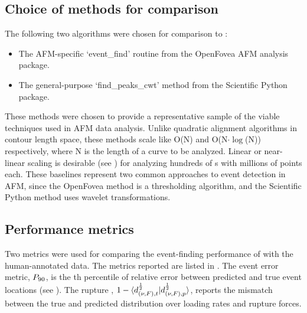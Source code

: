 \subsection{Choice of methods for comparison}

The following two algorithms were chosen for comparison to \name{}: 

\begin{itemize}
\item The AFM-specific `event\_find' routine from the OpenFovea AFM analysis package.
\item The general-purpose `find\_peaks\_cwt' method from the Scientific Python package.
\end{itemize}

 These methods were chosen to provide a representative sample of the viable techniques used in AFM data analysis. Unlike quadratic alignment algorithms in contour length space, these methods scale like O(N) and O(N$\cdot\log$(N)) respectively, where N is the length of a curve to be analyzed. Linear or near-linear scaling is desirable (see ) for analyzing hundreds of \fec{}s with millions of points each. These baselines represent two common approaches to event detection in AFM, since the OpenFovea method is a thresholding algorithm, and the Scientific Python method uses wavelet transformations. 

\subsection{Performance metrics}

Two metrics were used for comparing the event-finding performance of \name{} with the human-annotated data. The metrics reported are listed in . The event error metric, $P_{90{}}$, is the \qPct{}th percentile of relative error between predicted and true event locations (see ). The rupture \BccLong{}, $1-\braket{d_{(\nu,F),t}^{\frac{1}{2}}|d_{(\nu,F),p}^{\frac{1}{2}}}$, reports the mismatch between the true and predicted distribution over loading rates and rupture forces. 

